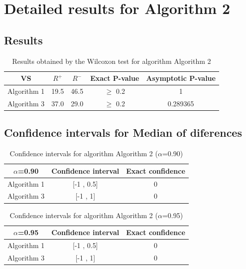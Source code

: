 \documentclass[a4paper,10pt]{article}
\begin{document}
 \clearpage 


\section{Detailed results for Algorithm 2}


\subsection{Results}

\begin{table}[!htp]
\centering\small
\begin{tabular}{
|c|c|c|c|c|}
\hline
 VS & $R^{+}$ & $R^{-}$ & Exact P-value & Asymptotic P-value \\ \hline 
Algorithm 1 & 19.5 & 46.5 & $\geq$ 0.2 & 1\\ \hline 
Algorithm 3 & 37.0 & 29.0 & $\geq$ 0.2 & 0.289365\\ \hline 

\end{tabular}
\caption{Results obtained by the Wilcoxon test for algorithm Algorithm 2}
\end{table}

\subsection{Confidence intervals for Median of diferences}

\begin{table}[!htp]
\centering\small
\begin{tabular}{
|c|c|c|}
\hline
 $\alpha$=0.90 & Confidence interval & Exact confidence \\ \hline 
Algorithm 1 & [-1 , 0.5] & 0\\ \hline 
Algorithm 3 & [-1 , 1] & 0\\ \hline 

\end{tabular}
\caption{Confidence intervals for algorithm Algorithm 2 ($\alpha$=0.90)}
\end{table}
\begin{table}[!htp]
\centering\small
\begin{tabular}{
|c|c|c|}
\hline
 $\alpha$=0.95 & Confidence interval & Exact confidence \\ \hline 
Algorithm 1 & [-1 , 0.5] & 0\\ \hline 
Algorithm 3 & [-1 , 1] & 0\\ \hline 

\end{tabular}
\caption{Confidence intervals for algorithm Algorithm 2 ($\alpha$=0.95)}
\end{table}
\end{document}
